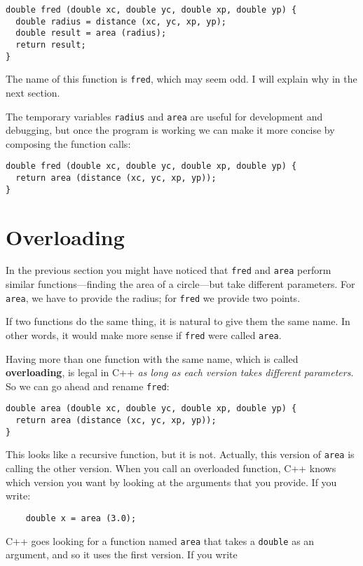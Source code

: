 \begin{verbatim}
double fred (double xc, double yc, double xp, double yp) {
  double radius = distance (xc, yc, xp, yp);
  double result = area (radius);
  return result;
} 
\end{verbatim}
%
The name of this function is {\tt fred}, which may seem odd.  I will
explain why in the next section.

The temporary variables {\tt radius} and {\tt area} are
useful for development and debugging, but once the program is
working we can make it more concise by composing
the function calls:

\begin{verbatim}
double fred (double xc, double yc, double xp, double yp) {
  return area (distance (xc, yc, xp, yp));
} 
\end{verbatim}

\section{Overloading}
\label{overloading}

In the previous section you might have noticed that {\tt fred}
and {\tt area} perform similar functions---finding
the area of a circle---but take different parameters.  For
{\tt area}, we have to provide the radius; for {\tt fred}
we provide two points.

If two functions do the same thing, it is natural to give them
the same name.  In other words, it would make more sense if
{\tt fred} were called {\tt area}.

Having more than one function with the same name, which is called {\bf
overloading}, is legal in C++ {\em as long as each version takes
different parameters}.  So we can go ahead and rename {\tt fred}:

\begin{verbatim}
double area (double xc, double yc, double xp, double yp) {
  return area (distance (xc, yc, xp, yp));
} 
\end{verbatim}
%
This looks like a recursive function, but it is not.  Actually,
this version of {\tt area} is calling the other version.
When you call an overloaded function, C++ knows which version you
want by looking at the arguments that you provide.  If you write:

\begin{verbatim}
    double x = area (3.0);
\end{verbatim}
%
C++ goes looking for a function named {\tt area} that
takes a {\tt double} as an argument, and so it uses the
first version.  If you write

